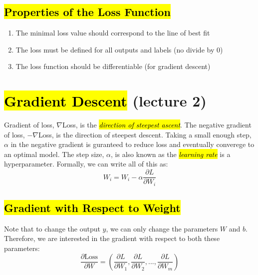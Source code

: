 \documentclass[11pt]{article}
\newcommand{\hlinfo}[1]{{\sethlcolor{lavender}\hl{#1}}}
\begin{document}

\subsection{\hl{Properties of the Loss Function}}

\begin{enumerate}
    \item {The minimal loss value should correspond to the line of best fit}
    \item {The loss must be defined for all outputs and labels (no divide by 0)}
    \item {The loss function should be differentiable (for gradient descent)}
\end{enumerate}

\section{\hl{Gradient Descent} (lecture 2)}

Gradient of loss, $\nabla$Loss, is the \hlinfo{\emph{direction of steepest ascent}}. The negative gradient of loss, $-\nabla$Loss, is the direction of steepest descent. Taking a small enough step, $\alpha$ in the negative gradient is guranteed to reduce loss and eventually converege to an optimal model. The step size, $\alpha$, is also known as the \hlinfo{\emph{learning rate}} is a hyperparameter. Formally, we can write all of this as:
\[W_i = W_i - \alpha \frac{\partial L}{\partial W_i}\]

\subsection{\hl{Gradient with Respect to Weight}}
Note that to change the output $\hat{y}$, we can only change the parameters $W$ and $b$. Therefore, we are interested in the gradient with respect to both these parameters:
\[\frac{\partial \text{Loss}}{\partial W} = \left( \frac{\partial L}{\partial W_1}, \frac{\partial L}{\partial W_2}, ..., \frac{\partial L}{\partial W_m} \right)\]
\end{document}
